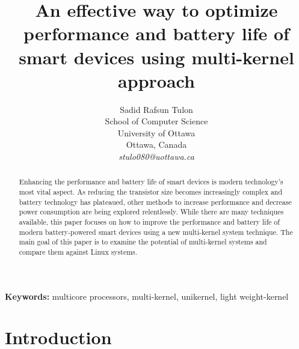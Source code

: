 \documentclass[11pt]{article}       %
\providecommand{\keywords}[1]{\textbf{Keywords:} #1}
\begin{document}


\title{An effective way to optimize performance and battery life of smart devices using multi-kernel approach}


\author{
Sadid Rafsun Tulon\\
School of Computer Science\\
University of Ottawa\\
Ottawa, Canada\\
{\em stulo080@uottawa.ca}
} %

\maketitle

\begin{abstract}
Enhancing the performance and battery life of smart devices is modern technology's most vital aspect. As reducing the transistor size becomes increasingly complex and battery technology has plateaued, other methods to increase performance and decrease power consumption are being explored relentlessly. While there are many techniques available, this paper focuses on how to improve the performance and battery life of modern battery-powered smart devices using a new multi-kernel system technique. The main goal of this paper is to examine the potential of multi-kernel systems and compare them against Linux systems.
\end{abstract}

\keywords{multicore processors, multi-kernel, unikernel, light weight-kernel }
\section{Introduction} \label{intro}
\end{document}
